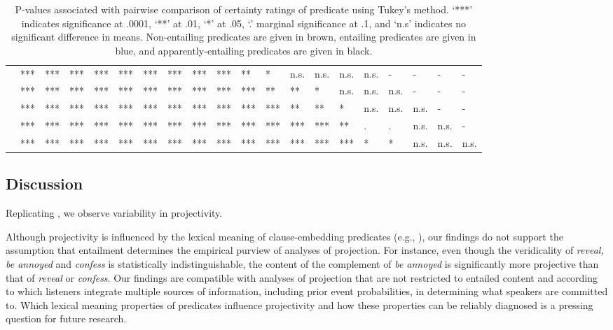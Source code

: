 \documentclass[11pt,fleqn]{article}
\newcommand{\6}{\mbox{$[\hspace*{-.6mm}[$}}
\newcommand{\9}{\mbox{$]\hspace*{-.6mm}]$}}
\begin{document}
\begin{landscape}
\begin{table}[h!]
\begin{tabular}{l l l l l l l l l l l l l l l l l l l l }
\color{brown}{\em hear}\color{black}		& *** & *** & *** & *** & *** & *** & *** & *** & *** & ** & * & n.s. & n.s. & n.s. & n.s. & - & - & - & - \\
\color{blue}{\em see}\color{black}			& *** & *** & *** & *** & *** & *** & *** & *** & *** & *** & ** & ** & * & n.s. & n.s. & n.s. & - & - & - \\
\color{black}{\em inform}\color{black}			& *** & *** & *** & *** & *** & *** & *** & *** & *** & *** & *** & ** & ** & * & n.s. & n.s. & n.s. & - & - \\
\color{blue}{\em know}\color{black}			& *** & *** & *** & *** & *** & *** & *** & *** & *** & *** & *** & *** & *** & ** & . & . & n.s. & n.s. & -  \\
\color{blue}{\em be annoyed}\color{black}		& *** & *** & *** & *** & *** & *** & *** & *** & ***  & ***  & *** & *** & *** & *** & * & * & n.s. & n.s. & n.s.  \\

\bottomrule
\end{tabular}
\caption{P-values associated with pairwise comparison of certainty ratings of predicate using Tukey's method. `***' indicates significance at .0001, `**' at .01, `*' at .05, `.' marginal significance at .1, and `n.s' indicates no significant difference in means. Non-entailing predicates are given in brown, entailing predicates are given in blue, and apparently-entailing predicates are given in black.}\label{t-pairwise-proj}
\end{table}
\end{landscape}




\subsection{Discussion}

Replicating \citealt{tbd-variability}, we observe variability in projectivity.


Although projectivity is influenced by the lexical meaning of clause-embedding predicates (e.g., \citealt{karttunen71b,tbd-variability}), our findings do not support the assumption that entailment determines the empirical purview of analyses of projection. For instance, even though the veridicality of {\em reveal, be annoyed} and {\em confess} is statistically indistinguishable, the content of the complement of {\em be annoyed} is significantly more projective than that of {\em reveal} or {\em confess}. Our findings are compatible with analyses of projection that are not restricted to entailed content and according to which listeners integrate multiple sources of information, including prior event probabilities, in determining what speakers are committed to. Which lexical meaning properties of predicates influence projectivity and how these properties can be reliably diagnosed is a pressing question for future research.
\end{document}
